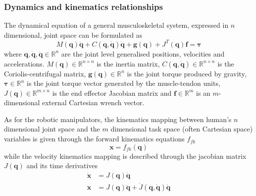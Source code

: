 \subsubsection{Dynamics and kinematics relationships}
\label{ch:human_dyn_kin}
The dynamical equation of a general musculoskeletal system, expressed in $n$ dimensional, joint space can be formulated as
\begin{equation}
    M(\bm{q})\ddot{\bm{q}} + C(\bm{q},\dot{\bm{q}})\dot{\bm{q}} + \bm{g}(\bm{q}) + J^{T}(\bm{q})\bm{f} = \bm{\tau} 
    \label{eq:human_dynamics}
\end{equation}
where $\bm{q},\dot{\bm{q}},\ddot{\bm{q}} \in \mathbb{R}^n $ are the joint level generalised positions, velocities and accelerations. $M(\bm{q})\in \mathbb{R}^{n\times n}$ is the inertia matrix, $C (\bm{q}, \dot{\bm{q}})\in \mathbb{R}^{n\times n}$ is the Coriolis-centrifugal matrix, $\bm{g}(\bm{q})\in \mathbb{R}^n$ is the joint torque produced by gravity, $\bm{\tau}\in \mathbb{R}^n$ is the joint torque vector generated by the muscle-tendon units, $J(\bm{q})\in\mathbb{R}^{m\times n}$ is the end effector Jacobian matrix and $\bm{f} \in \mathbb{R}^m$ is an $m$-dimensional external Cartesian wrench vector.

As for the robotic manipulators, the kinematics mapping between human's $n$ dimensional joint space and the  $m$ dimensional task space (often Cartesian space) variables is given through the forward kinematics equations $f_{fk}$ 
\begin{equation}
    \bm{x} = f_{fk} (\bm{q})
\end{equation}
while the velocity kinematics mapping is described through the jacobian matrix $J(\bm{q})$ and its time derivatives
\begin{subequations}
\begin{align}
\dot{\bm{x}}&= {J}(\bm{q})\dot{\bm{q}} \label{eq:js_to_cs_vaj_human:vel}\\
\ddot{\bm{x}}&= J(\bm{q})\ddot{\bm{q}} + \dot{J}(\bm{q},\dot{\bm{q}})\dot{\bm{q}} \label{eq:js_to_cs_vaj_human:accel}
 \end{align} \label{eq:js_to_cs_vaj_human}
\end{subequations}

